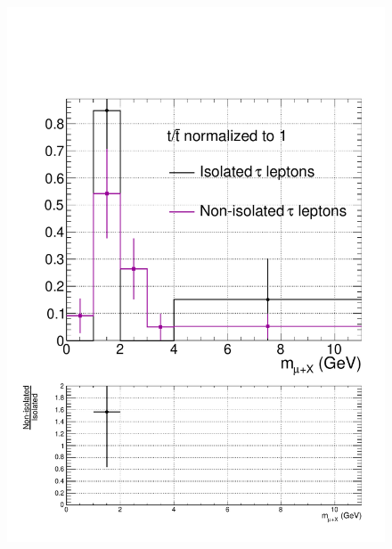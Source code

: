 \begin{figure}[hbtp]
  \begin{center}
    \includegraphics[width=0.6\cmsFigWidth]{figures/isoVsNonIsoTaus_SingleTop_lowMT_v87}

\end{center}
\end{figure}

